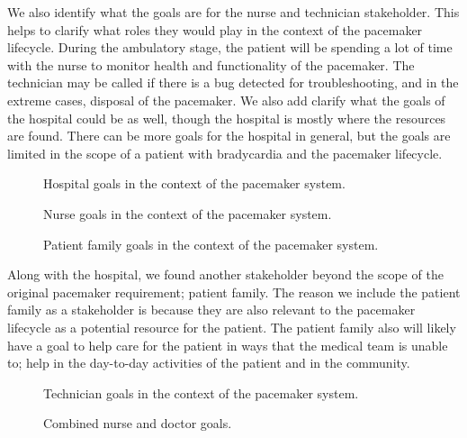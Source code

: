 We also identify what the goals are for the nurse and technician stakeholder. This helps to clarify what roles they would play in the context of the pacemaker lifecycle. During the ambulatory stage, the patient will be spending a lot of time with the nurse to monitor health and functionality of the pacemaker. The technician may be called if there is a bug detected for troubleshooting, and in the extreme cases, disposal of the pacemaker. We also add clarify what the goals of the hospital could be as well, though the hospital is mostly where the resources are found. There can be more goals for the hospital in general, but the goals are limited in the scope of a patient with bradycardia and the pacemaker lifecycle.

\begin{figure}
	\centering
	
	\caption{Hospital goals in the context of the pacemaker system.}
	\label{fig:hospital_goals}
\end{figure}

\begin{figure}
	\centering
	
	\caption{Nurse goals in the context of the pacemaker system.}
	\label{fig:nurse_goals}
\end{figure}

\begin{figure}
	\centering
	
	\caption{Patient family goals in the context of the pacemaker system.}
	\label{fig:patient_family_goals}
\end{figure}

Along with the hospital, we found another stakeholder beyond the scope of the original pacemaker requirement; patient family. The reason we include the patient family as a stakeholder is because they are also relevant to the pacemaker lifecycle as a potential resource for the patient. The patient family also will likely have a goal to help care for the patient in ways that the medical team is unable to; help in the day-to-day activities of the patient and in the community.

\begin{figure}
	\centering
	
	\caption{Technician goals in the context of the pacemaker system.}
	\label{fig:technician_goals}
\end{figure}

\begin{figure}
	\centering
	
	\caption{Combined nurse and doctor goals.}
	\label{fig:nurse_doctor_combined}
\end{figure}

